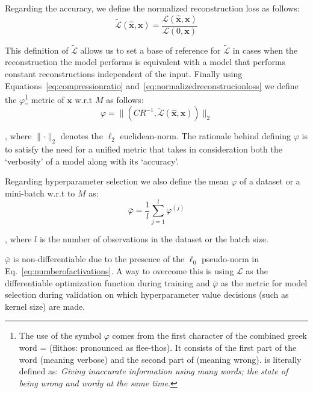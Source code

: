 \documentclass[journal]{IEEEtran}
\begin{document}
Regarding the accuracy, we define the normalized reconstruction loss as follows:
\begin{equation}
  \label{eq:normalizedreconstrucionloss}
  \tilde{\mathcal{L}}(\hat{\bm{x}},\bm{x}) = \frac{\mathcal{L}(\hat{\bm{x}},\bm{x})}{\mathcal{L}(0,\bm{x})}
\end{equation}

This definition of $\tilde{\mathcal{L}}$ allows us to set a base of reference for $\tilde{\mathcal{L}}$ in cases when the reconstruction the model performs is equivalent with a model that performs constant reconstructions independent of the input.
Finally using Equations~\ref{eq:compressionratio} and~\ref{eq:normalizedreconstrucionloss} we define the $\varphi$\footnote{The use of the symbol $\varphi$ comes from the first character of the combined greek word {} = {} (flithos: pronounced as flee-thos). It consists of the first part of the word {} (meaning verbose) and the second part of {} (meaning wrong). {} is literally defined as: \textit{Giving inaccurate information using many words; the state of being wrong and wordy at the same time}.} metric of $\bm{x}$ w.r.t $M$ as follows:
\begin{equation}
  \label{eq:flithos}
  \varphi=\lVert(CR^{-1},\tilde{\mathcal{L}}(\hat{\bm{x}},\bm{x}))\rVert_2
\end{equation}

\noindent
, where $\lVert \cdot \rVert_2$ denotes the $\ell_2$ euclidean-norm.
The rationale behind defining $\varphi$ is to satisfy the need for a unified metric that takes in consideration both the `verbosity' of a model along with its `accuracy'.

Regarding hyperparameter selection we also define the mean $\varphi$ of a dataset or a mini-batch w.r.t to $M$ as:
\begin{equation}
  \label{eq:meanflithos}
  \bar\varphi = \frac{1}{l}\sum\limits_{j=1}^l \varphi^{(j)}
\end{equation}

\noindent
, where $l$ is the number of observations in the dataset or the batch size.

$\bar\varphi$ is non-differentiable due to the presence of the $\ell_0$ pseudo-norm in Eq.~\ref{eq:numberofactivations}.
A way to overcome this is using $\mathcal{L}$ as the differentiable optimization function during training and $\bar\varphi$ as the metric for model selection during validation on which hyperparameter value decisions (such as kernel size) are made.
\end{document}
